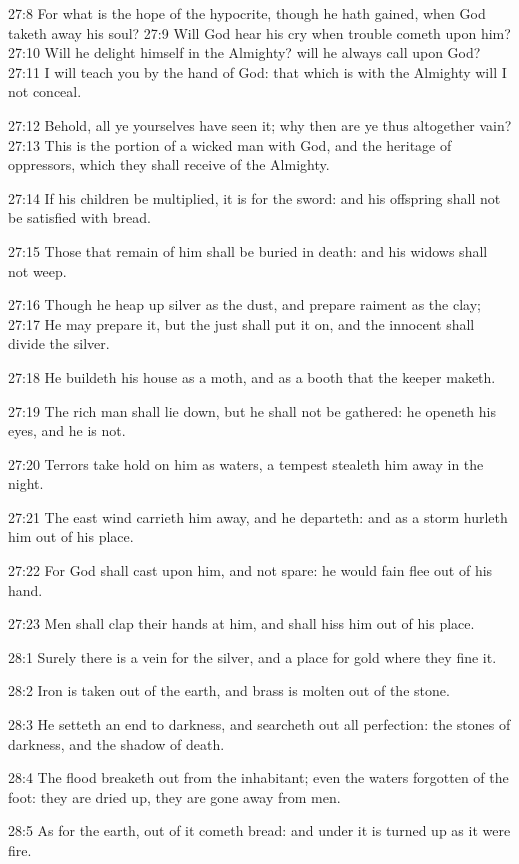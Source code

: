27:8 For what is the hope of the hypocrite, though he hath gained,
when God taketh away his soul?  27:9 Will God hear his cry when
trouble cometh upon him?  27:10 Will he delight himself in the
Almighty? will he always call upon God?  27:11 I will teach you by the
hand of God: that which is with the Almighty will I not conceal.

27:12 Behold, all ye yourselves have seen it; why then are ye thus
altogether vain?  27:13 This is the portion of a wicked man with God,
and the heritage of oppressors, which they shall receive of the
Almighty.

27:14 If his children be multiplied, it is for the sword: and his
offspring shall not be satisfied with bread.

27:15 Those that remain of him shall be buried in death: and his
widows shall not weep.

27:16 Though he heap up silver as the dust, and prepare raiment as the
clay; 27:17 He may prepare it, but the just shall put it on, and the
innocent shall divide the silver.

27:18 He buildeth his house as a moth, and as a booth that the keeper
maketh.

27:19 The rich man shall lie down, but he shall not be gathered: he
openeth his eyes, and he is not.

27:20 Terrors take hold on him as waters, a tempest stealeth him away
in the night.

27:21 The east wind carrieth him away, and he departeth: and as a
storm hurleth him out of his place.

27:22 For God shall cast upon him, and not spare: he would fain flee
out of his hand.

27:23 Men shall clap their hands at him, and shall hiss him out of his
place.

28:1 Surely there is a vein for the silver, and a place for gold where
they fine it.

28:2 Iron is taken out of the earth, and brass is molten out of the
stone.

28:3 He setteth an end to darkness, and searcheth out all perfection:
the stones of darkness, and the shadow of death.

28:4 The flood breaketh out from the inhabitant; even the waters
forgotten of the foot: they are dried up, they are gone away from men.

28:5 As for the earth, out of it cometh bread: and under it is turned
up as it were fire.

